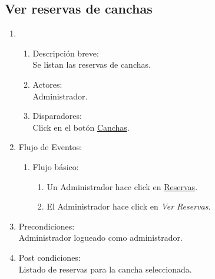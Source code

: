 \documentclass[a4paper,11pt]{article}
\begin{document}
\subsection{Ver reservas de canchas}
\begin{enumerate}

    \item
    \begin{enumerate}
    \item Descripci\'on breve: \\
        Se listan las reservas de canchas.
    \item Actores: \\
        Administrador.
    \item Disparadores: \\
        Click en el bot\'on \underline{Canchas}.
    \end{enumerate}

    \item Flujo de Eventos:

    \begin{enumerate}

        \item Flujo b\'asico:
		\begin{enumerate}
            	\item	Un Administrador hace click en \underline{Reservas}.
		\item	El Administrador hace click en \emph{Ver Reservas}.
		\end{enumerate}
    \end{enumerate}

    \item Precondiciones: \\
        Administrador logueado como administrador.

    \item Post condiciones: \\
        Listado de reservas para la cancha seleccionada.

\end{enumerate}

\end{document}
